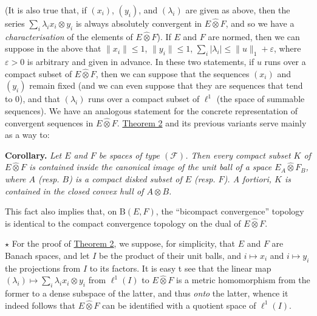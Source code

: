 \documentclass[british]{article}
\newenvironment{itenv}[1]
  {\phantomsection\par\smallskip\noindent\textbf{#1.}\itshape}
  {\par\smallskip}
\newcommand{\oldpage}[1]{\marginpar{\footnotesize$\Big\vert$ \textit{p.~#1}}}
\begin{document}
(It is also true that, if \((x_i)\), \((y_i)\), and \((\lambda_i)\) are
given as above, then the series \(\sum_i\lambda_i x_i\otimes y_i\) is
always absolutely convergent in \(E\hat{\otimes}F\), and so we have a
\emph{characterisation} of the elements of \(E\hat{\otimes}F\)). If
\(E\) and \(F\) are normed, then we can suppose in the above that
\(\|x_i\|\leqslant 1\), \(\|y_i\|\leqslant 1\),
\(\sum_i|\lambda_i|\leqslant\|u\|_1+\varepsilon\), where
\(\varepsilon>0\) is arbitrary and given in advance. In these two
statements, if \(u\) runs over a compact subset of \(E\hat{\otimes}F\),
then we can suppose that the sequences \((x_i)\) and \((y_i)\) remain
fixed (and we can even suppose that they are sequences that tend to
\(0\)), and that \((\lambda_i)\) runs over a compact subset of
\(\ell^1\) (the space of summable sequences). We have an analogous
statement for the concrete representation of convergent sequences in
\(E\hat{\otimes}F\). \hyperref[section-1-theorem-2]{Theorem 2} and its
previous variants serve mainly as a way to:

\begin{itenv}{Corollary}
Let \(E\) and \(F\) be spaces of type \((\mathscr{F})\). Then every
compact subset \(K\) of \(E\hat{\otimes}F\) is contained inside the
canonical image of the unit ball of a space \(E_A\hat{\otimes}F_B\),
where \(A\) (resp. \(B\)) is a compact disked subset of \(E\) (resp.
\(F\)). A fortiori, \(K\) is contained in the closed convex hull of
\(A\otimes B\).

\end{itenv}

This fact also implies that, on \(\mathrm{B}(E,F)\), the ``bicompact
convergence'' topology is identical to the compact convergence topology
on the dual of \(E\hat{\otimes}F\).

\(\star\) For the proof of \hyperref[section-1-theorem-2]{Theorem 2}, we
suppose, for simplicity, that \(E\) and \(F\) are Banach spaces, and let
\(I\) be the product of their unit balls, and \(i\mapsto x_i\) and
\(i\mapsto y_i\) the projections from \(I\) to its factors. It is easy t
see that the linear map
\((\lambda_i)\mapsto\sum_i\lambda_i x_i\otimes y_i\) from \(\ell^1(I)\)
to \(E\hat{\otimes}F\) is a metric homomorphism from the former to a
dense subspace of the latter, and thus \emph{onto} the latter, whence it
indeed follows that \(E\hat{\otimes}F\) can be identified with a
quotient space of \(\ell^1(I)\).

\oldpage{79}
\end{document}
